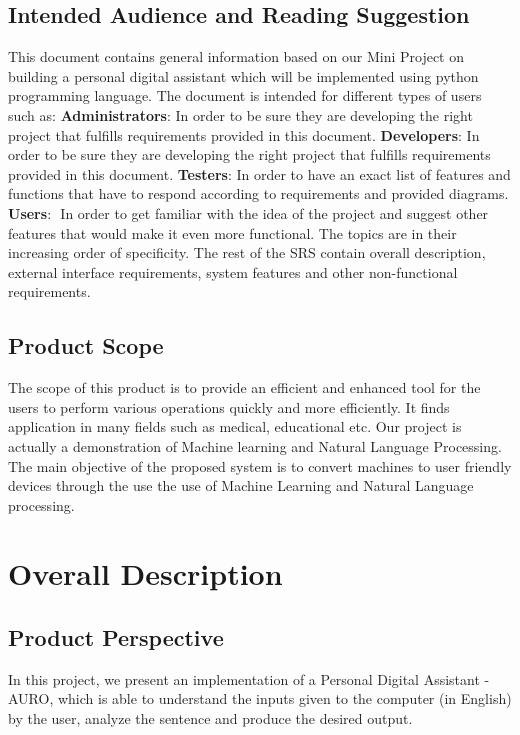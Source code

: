 \subsection*{Intended Audience and Reading Suggestion}
This document contains general information based on our Mini Project on building a personal digital assistant which will be implemented using python programming language.
The document is intended for different types of users such as:
\newline
\textbf{Administrators}:  In order to be sure they are developing the right project that fulfills
requirements provided in this document.
\newline
\textbf{Developers}: In order to be sure they are developing the right project that fulfills
requirements provided in this document.
\newline
\textbf{Testers}: In order to have an exact list of features and functions that have to respond according to requirements and provided diagrams. 
\newline
\textbf{Users}:​ ​ In order to get familiar with the idea of the project and suggest other features that would make it even more functional.
\newline
The topics are in their increasing order of specificity. The rest of the SRS contain overall description, external interface requirements, system features and other non-functional requirements.                               
\subsection*{Product Scope}
The scope of this product is to provide an efficient and enhanced tool for the users to perform various operations quickly and more efficiently.  It finds application in many fields such as medical, educational etc.  Our project is actually a demonstration of Machine learning and Natural Language Processing.  The main objective of the proposed system is to convert machines to user friendly devices through the use the use of Machine Learning and Natural Language processing. 

\section{Overall Description}
\subsection*{Product Perspective}
In this project, we present an implementation of a Personal Digital Assistant - AURO, which is  able to understand the inputs given to the computer (in English) by the user, analyze the sentence and produce the desired output.
